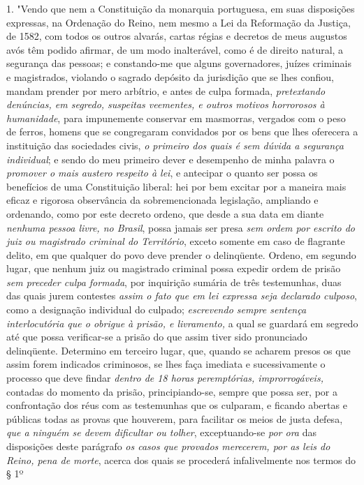 1. "Vendo que nem a Constituição da monarquia portuguesa, em suas
disposições expressas, na Ordenação do Reino, nem mesmo a Lei da
Reformação da Justiça, de 1582, com todos os outros alvarás, cartas
régias e decretos de meus augustos avós têm podido afirmar, de um modo
inalterável, como é de direito natural, a segurança das pessoas; e
constando-me que alguns governadores, juízes criminais e magistrados,
violando o sagrado depósito da jurisdição que se lhes confiou, mandam
prender por mero arbítrio, e antes de culpa formada, \emph{pretextando
denúncias, em segredo, suspeitas veementes, e outros motivos horrorosos
à humanidade}, para impunemente conservar em masmorras, vergados com o
peso de ferros, homens que se congregaram convidados por os bens que
lhes oferecera a instituição das sociedades civis, \emph{o primeiro dos
quais é sem dúvida a segurança individual}; e sendo do meu primeiro
dever e desempenho de minha palavra o \emph{promover o mais austero
respeito à lei}, e antecipar o quanto ser possa os benefícios de uma
Constituição liberal: hei por bem excitar por a maneira mais eficaz e
rigorosa observância da sobremencionada legislação, ampliando e
ordenando, como por este decreto ordeno, que desde a sua data em diante
\emph{nenhuma pessoa livre, no Brasil}, possa jamais ser presa \emph{sem
ordem por escrito do juiz ou magistrado criminal do Território}, exceto
somente em caso de flagrante delito, em que qualquer do povo deve
prender o delinqüente. Ordeno, em segundo lugar, que nenhum juiz ou
magistrado criminal possa expedir ordem de prisão \emph{sem preceder
culpa formada}, por inquirição sumária de três testemunhas, duas das
quais jurem contestes \emph{assim o fato que em lei expressa seja
declarado culposo}, como a designação individual do culpado;
\emph{escrevendo sempre sentença interlocutória que o obrigue à prisão,
e livramento,} a qual se guardará em segredo até que possa verificar-se
a prisão do que assim tiver sido pronunciado delinqüente. Determino em
terceiro lugar, que, quando se acharem presos os que assim forem
indicados criminosos, se lhes faça imediata e sucessivamente o processo
que deve findar \emph{dentro de 18 horas peremptórias, improrrogáveis,}
contadas do momento da prisão, principiando-se, sempre que possa ser,
por a confrontação dos réus com as testemunhas que os culparam, e
ficando abertas e públicas todas as provas que houverem, para facilitar
os meios de justa defesa, \emph{que a ninguém se devem dificultar ou
tolher}, exceptuando-se \emph{por ora} das disposições deste parágrafo
\emph{os casos que provados merecerem, por as leis do Reino, pena de
morte}, acerca dos quais se procederá infalivelmente nos termos do § 1º
